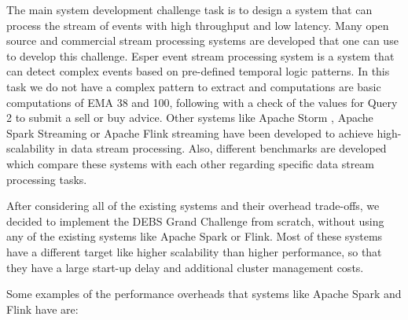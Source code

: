 The main system development challenge task is to design a system that can process the stream of events with high throughput and low latency.
Many open source and commercial stream processing systems are developed that one can use to develop this challenge.
Esper event stream processing system \cite{Bernhardt2007} is a system that can detect complex events based on pre-defined temporal logic patterns.
In this task we do not have a complex pattern to extract and computations are basic computations of EMA 38 and 100, following with a check of the values for
Query 2 to submit a sell or buy advice. Other systems like Apache Storm \cite{8288619}, Apache Spark Streaming \cite{zaharia2010spark} or
Apache Flink streaming \cite{alexandrov2014stratosphere} have been developed to achieve high-scalability in data stream processing.
Also, different benchmarks are developed \cite{8701904} which compare these systems with each other regarding specific data
stream processing tasks.

After considering all of the existing systems and their overhead trade-offs, we decided to implement the DEBS Grand Challenge from scratch,
without using any of the existing systems like Apache Spark or Flink. Most of these systems have a different target like higher scalability than higher performance, so that 
they have a large start-up delay and additional cluster management costs. 


Some examples of the performance overheads that systems like Apache Spark and Flink have are:

